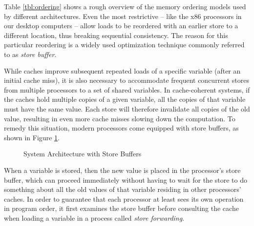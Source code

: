 Table \ref{tbl:ordering} shows a rough overview of the memory ordering models used by different architectures.
Even the most restrictive -- like the x86 processors in our desktop computers -- allow loads to be reordered with an earlier store to a different location, thus breaking sequential consistency.
The reason for this particular reordering is a widely used optimization technique commonly referred to as \emph{store buffer}.

While caches improve subsequent repeated loads of a specific variable (after an initial cache miss),
it is also necessary to accommodate frequent concurrent stores from multiple processors to a set of shared variables.
In cache-coherent systems, if the caches hold multiple copies of a given variable, all the copies of that variable must have the same value.
Each store will therefore invalidate all copies of the old value, resulting in even more cache misses slowing down the computation. %
To remedy this situation, modern processors come equipped with store buffers, as shown in Figure \ref{fig:intro:store-buffer}.


\begin{figure}[!h]
  \centering
  
  \caption{System Architecture with Store Buffers}
  \label{fig:intro:store-buffer}
\end{figure}

When a variable is stored, then the new value is placed in the processor's store buffer, which can proceed immediately without having to wait for the store to do something about all the old values of that variable residing in other processors' caches.
In order to guarantee that each processor at least sees its own operation in program order, it first examines the store buffer before consulting the cache when loading a variable in a process called \emph{store forwarding}.

\newpage

